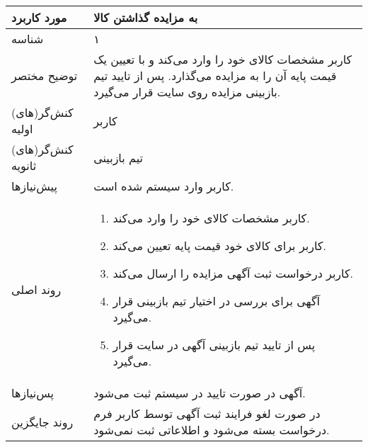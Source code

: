 \documentclass{article}
\begin{document}
\begin{center}
\bgroup
\def\arraystretch{1.5}
\begin{tabular} {|p{}|p{}|}
\hline
 مورد کاربرد & 
 به مزایده گذاشتن کالا
\\ \hline
 شناسه &
۱
\\ \hline
توضیح مختصر &
کاربر مشخصات کالای خود را وارد می‌کند و با تعیین یک قیمت پایه آن را به مزایده می‌گذارد.
پس از تایید تیم بازبینی مزایده روی سایت قرار می‌گیرد.
\\ \hline
کنش‌گر(های) اولیه &
کاربر
\\ \hline
کنش‌گر(های) ثانویه &
تیم بازبینی
\\ \hline
پیش‌نیازها &
کاربر وارد سیستم شده است.
\\ \hline
روند اصلی &
\begin{enumerate}[nosep,topsep=0cm]
\item
کاربر مشخصات کالای خود را وارد می‌کند.
\item
کاربر برای کالای خود قیمت پایه تعیین می‌کند.
\item
کاربر درخواست ثبت آگهی مزایده را ارسال می‌کند.
\item
آگهی برای بررسی در اختیار تیم بازبینی قرار می‌گیرد.
\item
پس از تایید تیم بازبینی آگهی در سایت قرار می‌گیرد.
\end{enumerate}
\\ \hline
پس‌نیازها &
آگهی در صورت تایید در سیستم ثبت می‌شود.
\\ \hline
روند جایگزین &
در صورت لغو فرایند ثبت آگهی توسط کاربر فرم درخواست بسته می‌شود و اطلاعاتی ثبت نمی‌شود.
\\ \hline
\end{tabular}
\egroup
\end{center}

\newpage
\end{document}

